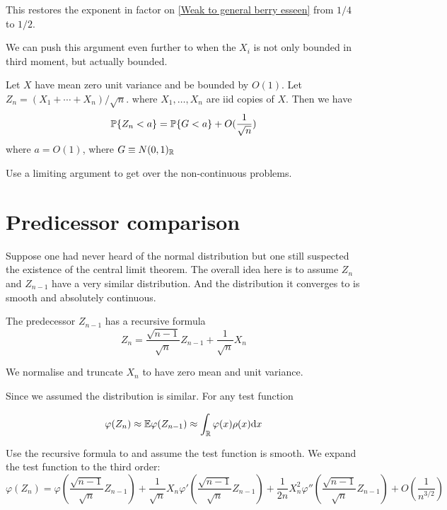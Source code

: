 This restores the exponent in factor on \ref{Weak to general berry esseen} from $1/4$ to $1/2$. 

We can push this argument even further to when the $X_i$ is not only bounded in third moment, but actually bounded.

\begin{theorem}
    Let $X$ have mean zero unit variance and be bounded by $O(1)$. Let $Z_n = (X_1+\cdots+X_n)/\sqrt{n}$. where $X_1,\dots,X_n$ are iid copies of $X$. Then we have 
    \begin{equation}
        \mathbb{P}\{Z_n<a\} = \mathbb{P} \{G<a\} +O(\frac{1}{\sqrt{n}})
    \end{equation}
    where $a=O(1)$, where $G\equiv N(0,1)_{\mathbb{R}}$
\end{theorem}

Use a limiting argument to get over the non-continuous problems.

\section{Predicessor comparison}

Suppose one had never heard of the normal distribution but one still suspected the existence of the central limit theorem. The overall idea here is to assume $Z_n$ and $Z_{n-1}$ have a very similar distribution. And the distribution it converges to is smooth and absolutely continuous.

The predecessor $Z_{n-1}$ has a recursive formula 
\begin{equation}
    \label{recursive formula for predecessor comparison}
    Z_n = \frac{\sqrt{n-1}}{\sqrt{n}}Z_{n-1}+\frac{1}{\sqrt{n}}X_n
\end{equation}

We normalise and truncate $X_n$ to have zero mean and unit variance.

Since we assumed the distribution is similar. 
For any test function 

\begin{equation*}
    \varphi(Z_n) \approx \mathbb{E} \varphi (Z_{n-1})\approx \int_{\mathbb{R}}  \varphi(x)\rho(x) \mathrm{d} x
\end{equation*}

Use the recursive formula to and assume the test function is smooth. We expand the test function to the third order:
\begin{equation*}
    \varphi(Z_n)=\varphi(\frac{\sqrt{n-1}}{\sqrt{n}} Z_{n-1}) +\frac{1}{\sqrt{n}}X_n\varphi'(\frac{\sqrt{n-1}}{\sqrt{n}}Z_{n-1})+\frac{1}{2n}X_n^2\varphi''(\frac{\sqrt{n-1}}{\sqrt{n}}Z_{n-1})+O(\frac{1}{n^{3/2}})
\end{equation*}

